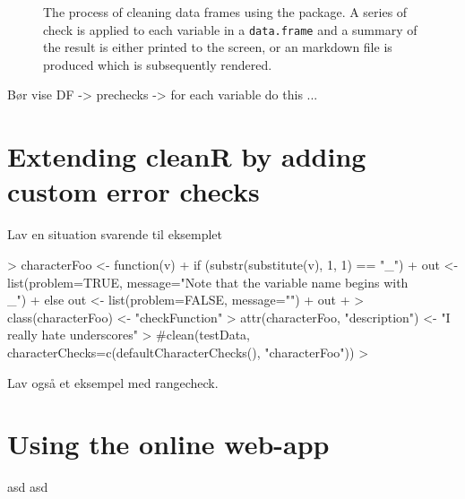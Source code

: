 \documentclass[article]{jss}
\begin{document}
\begin{figure}
\begin{center}
\end{center}
\label{fig:flowchart1}
\caption{The process of cleaning data frames using the 
  package. A series of check is applied to each variable in a
  \texttt{data.frame} and a summary of the result is either printed to
  the screen, or an  markdown file is produced which is
  subsequently rendered.}
\end{figure}

Bør vise DF -> prechecks -> for each variable do this ...



\section{Extending cleanR by adding custom error checks} \label{sec:extending}

Lav en situation svarende til eksemplet

\begin{Schunk}
\begin{Sinput}
> characterFoo <- function(v) {
+     if (substr(substitute(v), 1, 1) == "_") {
+         out <- list(problem=TRUE, message="Note that the variable name begins with \\_")
+     } else out <- list(problem=FALSE, message="")
+     out
+ }
> class(characterFoo) <- "checkFunction"
> attr(characterFoo, "description") <- "I really hate underscores"
> #clean(testData, characterChecks=c(defaultCharacterChecks(), "characterFoo"))
> 
\end{Sinput}
\end{Schunk}


Lav også et eksempel med rangecheck.




\section{Using the online web-app} \label{sec:web-app}

asd
asd
\end{document}
